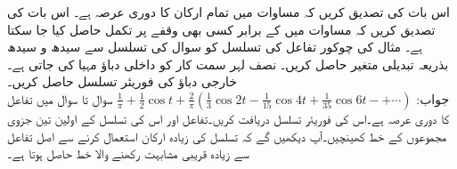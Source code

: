 
\quad
اس بات کی تصدیق کریں کہ مساوات  میں تمام ارکان کا دوری عرصہ  ہے۔
\quad اس بات کی تصدیق کریں کہ مساوات  میں  کے برابر کسی بھی وقفے پر تکمل حاصل کیا جا سکتا ہے۔
\quad
مثال  کی چوکور تفاعل کی تسلسل کو سوال  کی تسلسل  سے سیدھ و سیدھ بذریعہ تبدیلی متغیر حاصل کریں۔ 
\quad
نصف لہر سمت کار کو  داخلی دباؤ مہیا کی جاتی ہے۔خارجی دباؤ کی فوریئر تسلسل حاصل کریں۔\\
جواب:\quad
$\tfrac{1}{\pi}+\tfrac{1}{2}\cos t+\tfrac{2}{\pi}(\tfrac{1}{3}\cos 2t-\tfrac{1}{15}\cos 4t+\tfrac{1}{35}\cos 6t-+\cdots)$
سوال  تا سوال  میں تفاعل  کا دوری عرصہ  ہے۔اس کی فوریئر تسلسل دریافت کریں۔تفاعل  اور اس کی تسلسل کے اولین تین جزوی مجموعوں کے خط کھینچیں۔آپ دیکھیں گے کہ تسلسل کی زیادہ ارکان استعمال کرنے سے اصل تفاعل سے زیادہ قریبی مشابہت رکھنے والا خط حاصل ہوتا ہے۔

